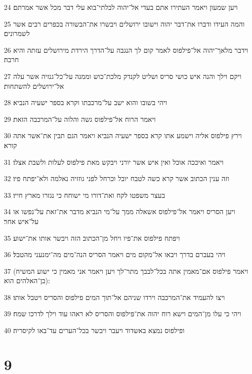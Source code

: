 \par 24 ויען שמעון ויאמר העתירו אתם בעדי אל־יהוה לבלתי־בוא עלי דבר מכל אשר אמרתם׃
\par 25 והמה העידו ודברו את־דבר יהוה וישובו ירושלים ויבשרו את־הבשורה בכפרים רבים אשר לשמרונים׃
\par 26 וידבר מלאך־יהוה אל־פילפוס לאמר קום לך הנגבה על־הדרך הירדת מירושלים עזתה והיא חרבה׃
\par 27 ויקם וילך והנה איש כושי סריס ושליט לקנדק מלכת־כוש וממנה על־כל־גנזיה אשר עלה אל־ירושלים להשתחות׃
\par 28 ויהי בשובו והוא ישב על־מרכבתו וקרא בספר ישעיה הנביא׃
\par 29 ויאמר הרוח אל־פילפוס גשה והלוה על־המרכבה הזאת׃
\par 30 וירץ פילפוס אליה וישמע אתו קרא בספר ישעיה הנביא ויאמר הגם תבין את־אשר אתה קורא׃
\par 31 ויאמר ואיככה אוכל ואין איש אשר יורני ויבקש מאת פילפוס לעלות ולשבת אצלו׃
\par 32 וזה ענין הכתוב אשר קרא כשה לטבח יובל וכרחל לפני גוזזיה נאלמה ולא־יפתח פיו׃
\par 33 בעצר משפטו לקח ואת־דורו מי ישוחח כי נגזרו מארץ חייו׃
\par 34 ויען הסריס ויאמר אל־פילפוס אשאלה ממך על־מי הנביא מדבר את־זאת על־נפשו או על־איש אחר׃
\par 35 ויפתח פילפוס את־פיו ויחל מן־הכתוב הזה ויבשר אותו את־ישוע׃
\par 36 ויהי בעברם בדרך ויבאו אל־מקום מים ויאמר הסריס הנה־מים מה־ימנעני מהטבל׃
\par 37 (ויאמר פילפוס אם־מאמין אתה בכל־לבבך מתר־לך ויען ויאמר אני מאמין כי ישוע המשיח בן־האלהים הוא)׃
\par 38 ויצו להעמיד את־המרכבה וירדו שניהם אל־תוך המים פילפוס והסריס ויטבל אותו׃
\par 39 ויהי כי עלו מן־המים וישא רוח יהוה את־פילפוס והסריס לא ראהו עוד וילך לדרכו שמח׃
\par 40 ופילפוס נמצא באשדוד ויעבר ויבשר בכל־הערים עד־באו לקיסריה׃

\chapter{9}


